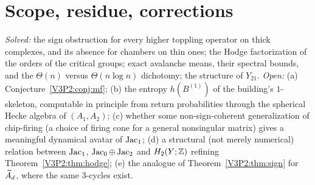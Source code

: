 \begin{table}[ht]
\centering\scriptsize
\renewcommand{\arraystretch}{1.2}
\medskip
\caption{Checks run by \texttt{code/v3p2\_verify.py}; the complexes are built by
\texttt{code/a2\_common.py}.}
\label{V3P2:tab:battery}
\end{table}

\section{Scope, residue, corrections}\label{V3P2:sec:scope}

\begin{remark}\label{V3P2:rem:scope}
\emph{Solved:} the sign obstruction for every higher toppling operator on thick complexes,
and its absence for chambers on thin ones; the Hodge factorization of the orders of the
critical groups; exact avalanche means, their spectral bounds, and the $\Theta(n)$ versus
$\Theta(n\log n)$ dichotomy; the structure of $Y_{21}$. \emph{Open:}
(a) Conjecture~\ref{V3P2:conj:mf};
(b) the entropy $h(B^{(1)})$ of the building's $1$-skeleton, computable in principle from
return probabilities through the spherical Hecke algebra of $(A_1,A_2)$;
(c) whether some non-sign-coherent generalization of chip-firing (a choice of firing cone
for a general nonsingular matrix) gives a meaningful dynamical avatar of $\operatorname{Jac}_1$;
(d) a structural (not merely numerical) relation between $\operatorname{Jac}_1$, $\operatorname{Jac}_0\oplus\operatorname{Jac}_2$ and
$H_2(Y;\mathbb{Z})$ refining Theorem~\ref{V3P2:thm:hodge};
(e) the analogue of Theorem~\ref{V3P2:thm:sign} for $\widetilde A_{d}$, where the same $3$-cycles
exist.
\end{remark}

